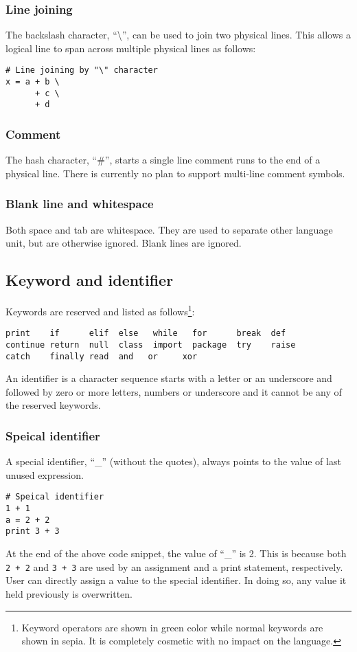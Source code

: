 \documentclass[10pt,a4paper]{article}
\begin{document}
\subsubsection{Line joining}
The backslash character, ``\textbackslash'', can be used to join two 
physical lines.
This allows a logical line to span across multiple physical lines as follows:
\begin{lstlisting}
# Line joining by "\" character
x = a + b \
      + c \
      + d
\end{lstlisting}

\subsubsection{Comment}
The hash character, ``\#'', starts a single line comment runs to the end
of a physical line. There is currently no plan to support multi-line
comment symbols.

\subsubsection{Blank line and whitespace}
Both space and tab are whitespace. They are used to separate other 
language unit, but are otherwise ignored. Blank lines are ignored.

\subsection{Keyword and identifier}
Keywords are reserved and listed as follows\footnote{Keyword operators 
are shown in green color while normal keywords are shown in sepia. It is 
completely cosmetic with no impact on the language.}:
\begin{lstlisting}
print    if      elif  else   while   for      break  def   
continue return  null  class  import  package  try    raise
catch    finally read  and   or     xor 
\end{lstlisting}

An identifier is a character sequence starts with a letter or an underscore 
and followed by zero or more letters, numbers or underscore and it cannot
be any of the reserved keywords.

\subsubsection{Speical identifier}
A special identifier, ``_'' (without the quotes), always points
to the value of last unused expression.
\begin{lstlisting}
# Speical identifier
1 + 1
a = 2 + 2
print 3 + 3
\end{lstlisting}
At the end of the above code snippet, the value of ``_'' is 2. This is because 
both \lstinline$2 + 2$ and \lstinline$3 + 3$ are used by an assignment and
a print statement, respectively. User can directly assign a value to the special
identifier. In doing so, any value it held previously is overwritten.
\end{document}
